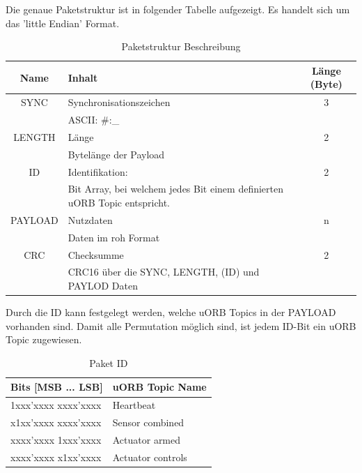 \noindent Die genaue Paketstruktur ist in folgender Tabelle aufgezeigt. Es handelt sich um das 'little Endian' Format. 
\begin{table}[ht]
\begin{center}
  \begin{tabular}{| c | l | c |}
    \hline
    Name & Inhalt & Länge (Byte) \\
    \hline
    SYNC  & Synchronisationszeichen  & 3 \\
          & ASCII: \#:\_                          &  \\
    \hline
    LENGTH & Länge & 2 \\
           & Bytelänge der Payload &  \\
    \hline
    ID & Identifikation: & 2 \\
       & Bit Array, bei welchem jedes Bit einem definierten uORB Topic entspricht.&  \\
    \hline
    PAYLOAD & Nutzdaten & n \\
            & Daten im roh Format & \\
    \hline
    CRC & Checksumme & 2 \\
        & CRC16 über die SYNC, LENGTH, (ID) und PAYLOD Daten & \\
    \hline
  \end{tabular}
  
  \caption{Paketstruktur Beschreibung}
  \label{tab:Paketstruktur Beschreibung}
  
\end{center}
\end{table}

\noindent Durch die ID kann festgelegt werden, welche uORB Topics in der PAYLOAD vorhanden sind. Damit alle Permutation möglich sind, ist jedem ID-Bit ein uORB Topic zugewiesen.

\begin{table}[ht]
\begin{center}
  \begin{tabular}{| l | l |}  
    \hline
    Bits [MSB ... LSB] & uORB Topic Name \\ \hline
    1xxx'xxxx xxxx'xxxx & Heartbeat\\ \hline
    x1xx'xxxx xxxx'xxxx & Sensor combined \\ \hline
    xxxx'xxxx 1xxx'xxxx & Actuator armed \\ \hline
    xxxx'xxxx x1xx'xxxx & Actuator controls \\ \hline
  \end{tabular}  
  \caption{Paket ID}
  \label{tab:Paket ID}  
\end{center}
\end{table}


